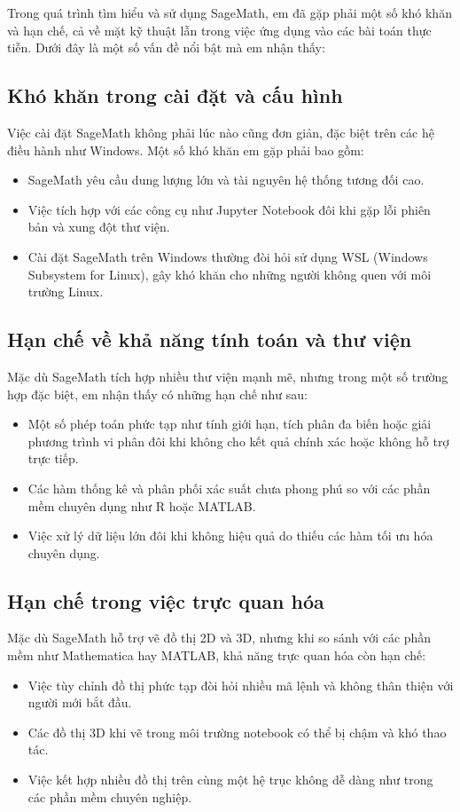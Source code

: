 Trong quá trình tìm hiểu và sử dụng SageMath, em đã gặp phải một số khó khăn và hạn chế, cả về mặt kỹ thuật lẫn trong việc ứng dụng vào các bài toán thực tiễn. Dưới đây là một số vấn đề nổi bật mà em nhận thấy:

\subsection{Khó khăn trong cài đặt và cấu hình}

Việc cài đặt SageMath không phải lúc nào cũng đơn giản, đặc biệt trên các hệ điều hành như Windows. Một số khó khăn em gặp phải bao gồm:
\begin{itemize}
	\item SageMath yêu cầu dung lượng lớn và tài nguyên hệ thống tương đối cao.
	\item Việc tích hợp với các công cụ như Jupyter Notebook đôi khi gặp lỗi phiên bản và xung đột thư viện.
	\item Cài đặt SageMath trên Windows thường đòi hỏi sử dụng WSL (Windows Subsystem for Linux), gây khó khăn cho những người không quen với môi trường Linux.
\end{itemize}

\subsection{Hạn chế về khả năng tính toán và thư viện}

Mặc dù SageMath tích hợp nhiều thư viện mạnh mẽ, nhưng trong một số trường hợp đặc biệt, em nhận thấy có những hạn chế như sau:
\begin{itemize}
	\item Một số phép toán phức tạp như tính giới hạn, tích phân đa biến hoặc giải phương trình vi phân đôi khi không cho kết quả chính xác hoặc không hỗ trợ trực tiếp.
	\item Các hàm thống kê và phân phối xác suất chưa phong phú so với các phần mềm chuyên dụng như R hoặc MATLAB.
	\item Việc xử lý dữ liệu lớn đôi khi không hiệu quả do thiếu các hàm tối ưu hóa chuyên dụng.
\end{itemize}

\subsection{Hạn chế trong việc trực quan hóa}

Mặc dù SageMath hỗ trợ vẽ đồ thị 2D và 3D, nhưng khi so sánh với các phần mềm như Mathematica hay MATLAB, khả năng trực quan hóa còn hạn chế:
\begin{itemize}
	\item Việc tùy chỉnh đồ thị phức tạp đòi hỏi nhiều mã lệnh và không thân thiện với người mới bắt đầu.
	\item Các đồ thị 3D khi vẽ trong môi trường notebook có thể bị chậm và khó thao tác.
	\item Việc kết hợp nhiều đồ thị trên cùng một hệ trục không dễ dàng như trong các phần mềm chuyên nghiệp.
\end{itemize}

